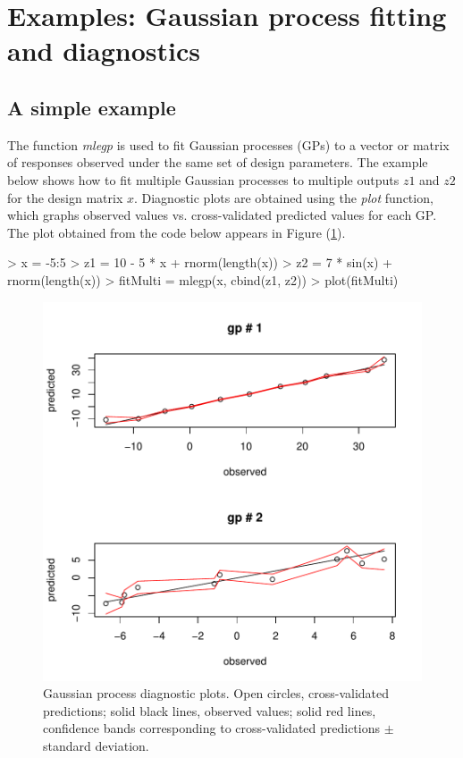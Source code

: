 

\section{Examples: Gaussian process fitting and diagnostics}
%
\subsection{A simple example}
The function {\it mlegp} is used to fit Gaussian processes (GPs) to a vector or matrix of responses observed under the same set of design parameters. The example below shows how to fit multiple Gaussian processes to multiple outputs $z1$ and $z2$ for the design matrix $x$.
Diagnostic plots are obtained using the {\it plot} function, which graphs observed values vs. cross-validated predicted values for each GP. The plot obtained from the code below appears in Figure (\ref{fig:diag1}).

\begin{Schunk}
\begin{Sinput}
> x = -5:5
> z1 = 10 - 5 * x + rnorm(length(x))
> z2 = 7 * sin(x) + rnorm(length(x))
> fitMulti = mlegp(x, cbind(z1, z2))
> plot(fitMulti)
\end{Sinput}
\end{Schunk}
\begin{figure}[htbp]
  \begin{center}
\includegraphics{gp_ex-003}
    \caption{Gaussian process diagnostic plots. Open circles, cross-validated predictions; solid black lines, observed values; solid red lines, confidence bands corresponding to cross-validated predictions $\pm$ standard deviation.}
    \label{fig:diag1}
  \end{center}
\end{figure}

